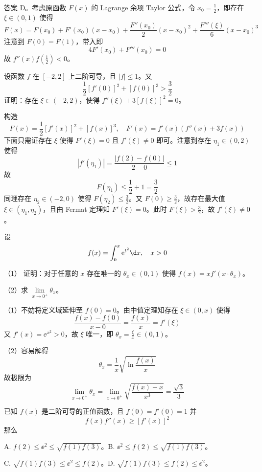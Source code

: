 \begin{solution}
	答案 D。考虑原函数 $F(x)$ 的 Lagrange 余项 Taylor 公式，令 $x_0 = \frac{1}{2}$，即存在 $\xi \in (0, 1)$ 使得
	\[ F(x) = F(x_0) + F'(x_0)(x-x_0) + \frac{F''(x_0)}{2}(x-x_0)^2 + \frac{F'''(\xi)}{6}(x-x_0)^3 \]
	注意到 $F(0) = F(1)$，带入即
	\[ 4 F'(x_0) + F'''(x_0) = 0 \]
	故 $f''(x) f(\frac{1}{2}) < 0$。
\end{solution}


\begin{problem}[000024]
设函数 $f$ 在 $[-2, 2]$ 上二阶可导，且 $|f| \leqslant 1$。又
\[ \frac{1}{2}[f'(0)]^2 + [f(0)]^3 > \frac{3}{2} \]
证明：存在 $\xi \in (-2,2)$，使得 $f''(\xi) + 3[f(\xi)]^2 = 0$。
\end{problem}

\begin{solution}
	构造
	\[ F(x) = \frac{1}{2}[f'(x)]^2 + [f(x)]^3,\quad F'(x) = f'(x)(f''(x) + 3f(x)) \]
	下面只需证存在 $\xi$ 使得 $F'(\xi) = 0$ 且 $f'(\xi) \neq 0$ 即可。注意到存在 $\eta_1 \in (0, 2)$ 使得
	\[ |f'(\eta_1)| = \frac{|f(2) - f(0)|}{2 - 0} \leqslant 1 \]
	故
	\[ F(\eta_1) \leqslant \frac{1}{2} + 1 = \frac{3}{2} \]
	同理存在 $\eta_2 \in (-2, 0)$ 使得 $F(\eta_2) \leqslant \frac{3}{2}$。又 $F(0) \geqslant \frac{3}{2}$，故存在最大值 $\xi \in (\eta_1, \eta_2)$，且由 Fermat 定理知 $F'(\xi) = 0$。此时 $F(\xi) > \frac{3}{2}$，故 $f'(\xi) \neq 0$。
\end{solution}


\begin{problem}[000025]
设
\[ f(x) = \int_{0}^{x} \ee^{t^2} \d x, \quad x > 0 \]

（1） 证明：对于任意的 $x$ 存在唯一的 $\theta_x \in (0, 1)$ 使得 $f(x) = x f'(x \cdot \theta_x)$。

（2）求 $\lim\limits_{x \to 0^+} \theta_x$。
\end{problem}

\begin{solution}
	（1）不妨将定义域延伸至 $f(0) = 0$。由中值定理知存在 $\xi \in (0, x)$ 使得
	\[ \frac{f(x) - f(0)}{x - 0} = \frac{f(x)}{x} = f'(\xi) \]
	又 $f'(x) = \ee^{x^2} > 0$，故 $\xi$ 唯一，即 $\theta_x = \frac{\xi}{x} \in (0, 1)$。

	（2）容易解得
	\[ \theta_x = \frac{1}{x} \sqrt{\ln \frac{f(x)}{x}} \]
	故极限为
	\[ \lim_{x \to 0^+} \theta_x = \lim_{x \to 0^+} \sqrt{\frac{f(x) - x}{x^3}} = \frac{\sqrt{3}}{3} \]
\end{solution}

\begin{problem}[000026]
已知 $f(x)$ 是二阶可导的正值函数，且 $f(0) = f'(0) = 1$ 并
\[ f(x) f''(x) \geqslant [f'(x)]^2 \]
那么

A. $f(2) \leqslant \ee^2 \leqslant \sqrt{f(1)f(3)}$。B. $\ee^2 \leqslant f(2) \leqslant \sqrt{f(1)f(3)}$。

C. $\sqrt{f(1)f(3)} \leqslant \ee^2 \leqslant f(2)$。D. $\sqrt{f(1)f(3)} \leqslant f(2) \leqslant \ee^2$。
\end{problem}

